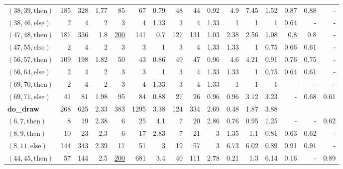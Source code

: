 \documentclass[sigconf,review, anonymous]{acmart}
\newcommand{\thenBr}{\text{then}}
\newcommand{\elseBr}{\text{else}}
\newcommand{\un}[1]{\underline{#1}}
\begin{document}
\begin{table}[!t]
\begin{tabular}{l|rrr|rrr|rrr|rrr|rrr}
    $(38,39,\thenBr)$        & 185      & 328  & 1.77      & 85   & 67  & 0.79          & 48  & 44  & 0.92             & 4.9    & 7.45  & 1.52   & 0.87 & 0.88 & -  \\
    $(38,46,\elseBr)$        & 2        & 4    & 2         & 3    & 4   & 1.33          & 3   & 4   & 1.33             & 1      & 1     & 1      & 0.64 & - & -  \\
    $(47,48,\thenBr)$        & 187      & 336  & 1.8       & \un{200} & 141 & 0.7       & 127 & 131 & 1.03             & 2.38   & 2.56  & 1.08   & 0.8  & 0.8  & -  \\
    $(47,55,\elseBr)$        & 2        & 4    & 2         & 3    & 3   & 1             & 3   & 4   & 1.33             & 1.33   & 1     & 0.75   & 0.66 & 0.61 & -  \\
    $(56,57,\thenBr)$        & 109      & 198  & 1.82      & 50   & 43  & 0.86          & 49  & 47  & 0.96             & 4.6    & 4.21  & 0.91   & 0.76 & 0.75 & -   \\
    $(56,64,\elseBr)$        & 2        & 4    & 2         & 3    & 3   & 1             & 3   & 4   & 1.33             & 1.33   & 1     & 0.75   & 0.64 & 0.61 & -  \\
    $(69,70,\thenBr)$        & 2        & 4    & 2         & 3    & 4   & 1.33          & 3   & 4   & 1.33             & 1      & 1     & 1      & - & - & -  \\
    $(69,71,\elseBr)$        & 41       & 81   & 1.98      & 95   & 84  & 0.88          & 27  & 26  & 0.96             & 0.96   & 3.12  & 3.23   & - & 0.68 & 0.61  \\
    \hline
    \textbf{do\_draw}        & 268      & 625  & 2.33      & 383  & 1295 & 3.38         & 124 & 334 & 2.69             & 0.48   & 1.87  & 3.88   &      &      &       \\
    $(6,7,\thenBr)$          & 8        & 19   & 2.38      & 6    & 25   & 4.1          & 7   & 20  & 2.86             & 0.76   & 0.95  & 1.25   & - & -  &  0.62 \\
    $(8,9,\thenBr)$          & 10       & 23   & 2.3       & 6    & 17   & 2.83         & 7   & 21  & 3                & 1.35   & 1.1   & 0.81   & 0.63 & 0.62 &  - \\
    $(8,11,\elseBr)$         & 144      & 343  & 2.39      & 17   & 51   & 3            & 19  & 57  & 3                & 6.73   & 6.02  & 0.89   & 0.91 & 0.91 &  - \\
    $(44,45,\thenBr)$        & 57       & 144  & 2.5       & \un{200} & 681  & 3.4      & 40  & 111 & 2.78             & 0.21   & 1.3   & 6.14   & 0.16 & - &  0.89 \\

\end{tabular}
\end{table}
\end{document}
